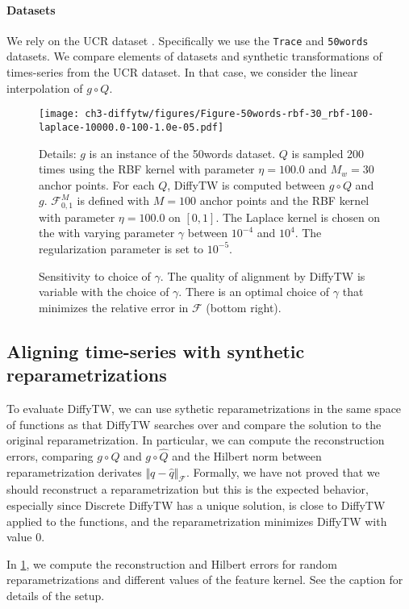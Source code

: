 \paragraph{Datasets} We rely on the UCR dataset \citep{ucr}. Specifically we use the \texttt{Trace} and \texttt{50words} datasets. We compare elements of datasets and synthetic transformations of times-series from the UCR dataset. In that case, we consider the linear interpolation of $g \circ Q$.

\begin{figure}[ht!]
\begin{center}
\texttt{[image: ch3-diffytw/figures/Figure-50words-rbf-30\_rbf-100-laplace-10000.0-100-1.0e-05.pdf]}
\end{center}
\caption[Sensitivity to choice of $\gamma$]{Sensitivity to choice of $\gamma$. The quality of alignment by DiffyTW is variable with the choice of $\gamma$. There is an optimal choice of $\gamma$ that minimizes the relative error in $\mathcal F$ (bottom right).}
\small Details: $g$ is an instance of the 50words dataset.
$Q$ is sampled 200 times using the RBF kernel with parameter $\eta=100.0$ and $M_w=30$ anchor points.
For each $Q$, DiffyTW is computed between $g\circ Q$ and $g$.
$\mathcal F_{0,1}^M$ is defined with $M=100$ anchor points and the RBF kernel with parameter $\eta=100.0$ on $[0,1]$.
The Laplace kernel is chosen on the with varying parameter $\gamma$ between $10^{-4}$ and $10^{4}$.
The regularization parameter is set to $10^{-5}$.
\label{fig:gamma-sensitivity-50words}
\end{figure}


\subsection{Aligning time-series with synthetic reparametrizations}
To evaluate DiffyTW, we can use sythetic reparametrizations in the same space of functions as that DiffyTW searches over and compare the solution to the original reparametrization. In particular, we can compute the reconstruction errors, comparing $g\circ Q$ and $g \circ \hat Q$ and the Hilbert norm between reparametrization derivates $\Vert q - \hat q\Vert_\mathcal F$. Formally, we have not proved that we should reconstruct a reparametrization but this is the expected behavior, especially since Discrete DiffyTW has a unique solution, is close to DiffyTW applied to the functions, and the reparametrization minimizes DiffyTW with value $0$.

In \cref{fig:gamma-sensitivity-50words}, we compute the reconstruction and Hilbert errors for random reparametrizations and different values of the feature kernel. See the caption for details of the setup.


